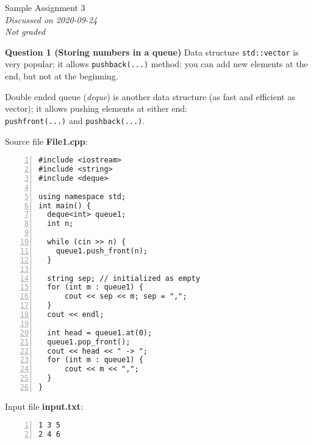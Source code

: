 \documentclass[11pt]{article}
\begin{document}
\thispagestyle{empty}

\twocolumn


\begin{center}
{\Large Sample Assignment 3}\\
{\em Discussed on 2020-09-24}\\
{\em Not graded}
\end{center}

\vspace{10pt}
{\bf Question 1 (Storing numbers in a queue)} Data structure {\tt std::vector} 
is very popular; it allows {\tt push\textunderscore{}back(...)} method:
you can add new elements at the end, but not at the beginning. 

Double ended queue ({\em deque}) is another data structure (as fast and efficient as vector); 
it allows pushing elements at either end:\\
{\tt push\textunderscore{}front(...)} and {\tt push\textunderscore{}back(...)}.

\vspace{10pt}
Source file {\bf File1.cpp}:
{\footnotesize
\begin{center}
\begin{minipage}{.85\columnwidth}
\begin{Verbatim}[frame=single,numbers=left]
#include <iostream>
#include <string>
#include <deque>

using namespace std;
int main() {
  deque<int> queue1;
  int n; 

  while (cin >> n) { 
    queue1.push_front(n); 
  }
  
  string sep; // initialized as empty
  for (int m : queue1) { 
      cout << sep << m; sep = ","; 
  } 
  cout << endl;

  int head = queue1.at(0);
  queue1.pop_front();
  cout << head << " -> ";
  for (int m : queue1) { 
      cout << m << ",";
  }
}  
\end{Verbatim}
\end{minipage}
\end{center}
}

\vspace{10pt}
Input file {\bf input.txt}:
{\footnotesize
\begin{center}
\begin{minipage}{.85\columnwidth}
\begin{Verbatim}[frame=single,numbers=left]
1 3 5
2 4 6
\end{Verbatim}
\end{minipage}
\end{center}
}
\end{document}
